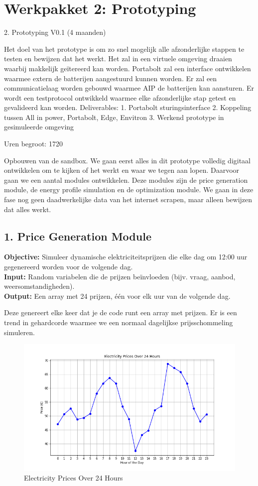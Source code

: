 \section{Werkpakket 2: Prototyping}
2. Prototyping V0.1 (4 maanden) 

Het doel van het prototype is om zo snel mogelijk alle afzonderlijke stappen te testen en bewijzen dat het werkt. Het zal in een virtuele omgeving draaien waarbij makkelijk geïtereerd kan worden. Portabolt zal een interface ontwikkelen waarmee extern de batterijen aangestuurd kunnen worden. Er zal een communicatielaag worden gebouwd waarmee AIP de batterijen kan aansturen. Er wordt een testprotocol ontwikkeld waarmee elke afzonderlijke stap getest en gevalideerd kan worden. 
Deliverables: 
1. Portabolt sturingsinterface 
2. Koppeling tussen All in power, Portabolt, Edge, Envitron 
3. Werkend prototype in gesimuleerde omgeving 

Uren begroot: 1720

Opbouwen van de sandbox. We gaan eerst alles in dit prototype volledig digitaal ontwikkelen om te kijken of het werkt en waar we tegen aan lopen. Daarvoor gaan we een aantal modules ontwikkelen. Deze modules zijn de price generation module, de energy profile simulation en de optimization module. We gaan in deze fase nog geen daadwerkelijke data van het internet scrapen, maar alleen bewijzen dat alles werkt.   

\subsection{1. Price Generation Module}
\textbf{Objective:} Simuleer dynamische elektriciteitsprijzen die elke dag om 12:00 uur gegenereerd worden voor de volgende dag. \\
\textbf{Input:} Random variabelen die de prijzen beïnvloeden (bijv. vraag, aanbod, weersomstandigheden). \\
\textbf{Output:} Een array met 24 prijzen, één voor elk uur van de volgende dag.

Deze genereert elke keer dat je de code runt een array met prijzen. Er is een trend in gehardcorde waarmee we een normaal dagelijkse prijsschommeling simuleren. 

\begin{figure}[h!]
  \centering
  \includegraphics[width=\textwidth]{../docs/figures/price_generation_plot.png}
  \caption{Electricity Prices Over 24 Hours}
  \label{fig:price_plot}
\end{figure}

